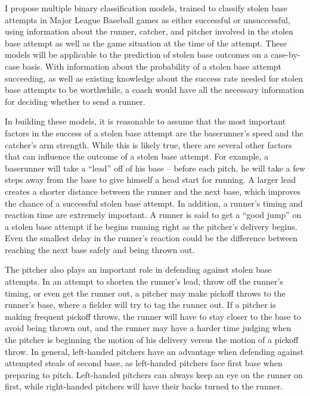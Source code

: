 \documentclass{article}
\begin{document}
I propose multiple binary classification models, trained to classify stolen base attempts in Major League Baseball games as either successful or unsuccessful, using information about the runner, catcher, and pitcher involved in the stolen base attempt as well as the game situation at the time of the attempt. These models will be applicable to the prediction of stolen base outcomes on a case-by-case basis. With information about the probability of a stolen base attempt succeeding, as well as existing knowledge about the success rate needed for stolen base attempts to be worthwhile, a coach would have all the necessary information for deciding whether to send a runner. 

In building these models, it is reasonable to assume that the most important factors in the success of a stolen base attempt are the baserunner’s speed and the catcher’s arm strength. While this is likely true, there are several other factors that can influence the outcome of a stolen base attempt. For example, a baserunner will take a “lead” off of his base – before each pitch, he will take a few steps away from the base to give himself a head start for running. A larger lead creates a shorter distance between the runner and the next base, which improves the chance of a successful stolen base attempt. In addition, a runner’s timing and reaction time are extremely important. A runner is said to get a “good jump” on a stolen base attempt if he begins running right as the pitcher’s delivery begins. Even the smallest delay in the runner’s reaction could be the difference between reaching the next base safely and being thrown out. 

The pitcher also plays an important role in defending against stolen base attempts. In an attempt to shorten the runner’s lead, throw off the runner’s timing, or even get the runner out, a pitcher may make pickoff throws to the runner’s base, where a fielder will try to tag the runner out. If a pitcher is making frequent pickoff throws, the runner will have to stay closer to the base to avoid being thrown out, and the runner may have a harder time judging when the pitcher is beginning the motion of his delivery versus the motion of a pickoff throw. In general, left-handed pitchers have an advantage when defending against attempted steals of second base, as left-handed pitchers face first base when preparing to pitch. Left-handed pitchers can always keep an eye on the runner on first, while right-handed pitchers will have their backs turned to the runner. 
\end{document}
